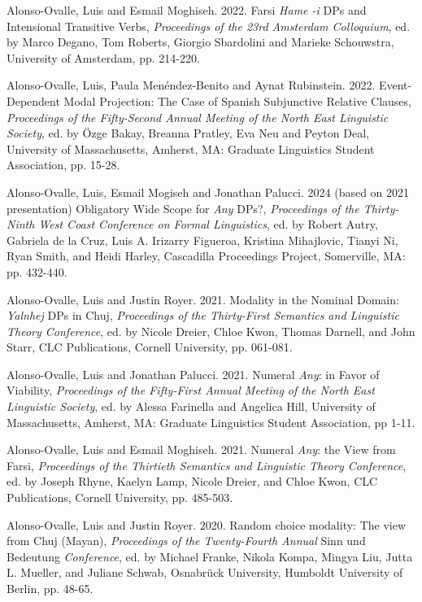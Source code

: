 \documentclass[11pt]{article}
\begin{document}
Alonso-Ovalle, Luis and Esmail Moghiseh. 2022. Farsi \textit{Hame -i} DPs and Intensional Transitive Verbs, \textit{Proceedings of the 23rd Amsterdam Colloquium}, ed. by Marco Degano, Tom Roberts, Giorgio Sbardolini and Marieke Schouwstra, University of Amsterdam, pp. 214-220.%

Alonso-Ovalle, Luis, Paula Men\'endez-Benito and Aynat Rubinstein. 2022. Event-Dependent Modal Projection: The Case of Spanish Subjunctive Relative Clauses, \textit{Proceedings of the Fifty-Second Annual Meeting of the North East Linguistic Society}, ed. by \"{O}zge Bakay, Breanna Pratley, Eva Neu and Peyton Deal, University of Massachusetts, Amherst, MA: Graduate Linguistics Student Association, pp. 15-28.

Alonso-Ovalle, Luis, Esmail Mogiseh and Jonathan Palucci. 2024 (based on 2021 presentation) Obligatory Wide Scope for \textit{Any} DPs?, \textit{Proceedings of the Thirty-Ninth West Coast Conference on Formal Linguistics}, ed. by Robert Autry, Gabriela de la Cruz, Luis A. Irizarry Figueroa, Kristina Mihajlovic, Tianyi Ni, Ryan Smith, and Heidi Harley, Cascadilla Proceedings Project, Somerville, MA: pp. 432-440.


Alonso-Ovalle, Luis and Justin Royer. 2021. Modality in the Nominal Domain: \textit{Yalnhej} DPs in Chuj, \textit{Proceedings of the Thirty-First Semantics and Linguistic Theory Conference}, ed. by Nicole Dreier, Chloe Kwon, Thomas Darnell, and John Starr, CLC Publications, Cornell University, pp. 061-081.

Alonso-Ovalle, Luis and Jonathan Palucci. 2021. Numeral \textit{Any}: in Favor of Viability, \textit{Proceedings of the Fifty-First Annual Meeting of the North East Linguistic Society}, ed. by Alessa Farinella and Angelica Hill, University of Massachusetts, Amherst, MA: Graduate Linguistics Student Association, pp 1-11.

 Alonso-Ovalle, Luis and Esmail Moghiseh. 2021. Numeral \textit{Any}: the View from Farsi, \textit{Proceedings of the Thirtieth Semantics and Linguistic Theory Conference}, ed. by Joseph Rhyne, Kaelyn Lamp, Nicole Dreier, and Chloe Kwon, CLC Publications, Cornell University, pp. 485-503. %
      
    Alonso-Ovalle, Luis and Justin Royer. 2020. Random choice modality: The view from Chuj (Mayan), \textit{Proceedings of the Twenty-Fourth Annual} Sinn und Bedeutung \textit{Conference}, ed. by Michael Franke, Nikola Kompa, Mingya Liu, Jutta L. Mueller, and Juliane Schwab, Osnabr\"{u}ck University, Humboldt University of Berlin, pp. 48-65. 
    
\end{document}
